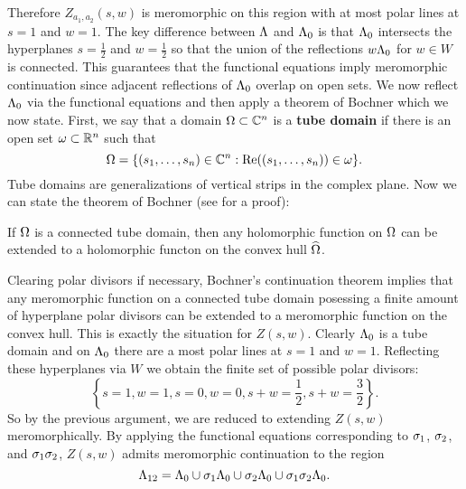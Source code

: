 \documentclass[12pt,reqno,oneside]{amsart}
\begin{document}
    Therefore $Z_{a_{1},a_{2}}(s,w)$ is meromorphic on this region with at most polar lines at $s = 1$ and $w = 1$. The key difference between $\Lambda$ and $\Lambda_{0}$ is that $\Lambda_{0}$ intersects the hyperplanes $s = \frac{1}{2}$ and $w = \frac{1}{2}$ so that the union of the reflections $w\Lambda_{0}$ for $w \in W$ is connected. This guarantees that the functional equations imply meromorphic continuation since adjacent reflections of $\Lambda_{0}$ overlap on open sets. We now reflect $\Lambda_{0}$ via the functional equations and then apply a theorem of Bochner which we now state. First, we say that a domain $\Omega \subset \mathbb{C}^{n}$ is a \textbf{tube domain} if there is an open set $\omega \subset \mathbb{R}^{n}$ such that
    \[
        \Omega = \{(s_{1},\ldots,s_{n}) \in \mathbb{C}^{n}:\mathrm{Re}((s_{1},\ldots,s_{n})) \in \omega\}.
    \]
    Tube domains are generalizations of vertical strips in the complex plane. Now we can state the theorem of Bochner (see \cite{hormander2000introduction} for a proof):

    \begin{theorem}
        If $\Omega$ is a connected tube domain, then any holomorphic function on $\Omega$ can be extended to a holomorphic functon on the convex hull $\widehat{\Omega}$.
    \end{theorem}

    Clearing polar divisors if necessary, Bochner's continuation theorem implies that any meromorphic function on a connected tube domain posessing a finite amount of hyperplane polar divisors can be extended to a meromorphic function on the convex hull. This is exactly the situation for $Z(s,w)$. Clearly $\Lambda_{0}$ is a tube domain and on $\Lambda_{0}$ there are a most polar lines at $s = 1$ and $w = 1$. Reflecting these hyperplanes via $W$ we obtain the finite set of possible polar divisors:
    \[
        \left\{s = 1, w = 1, s = 0, w = 0, s+w = \frac{1}{2}, s+w = \frac{3}{2}\right\}.
    \]
    So by the previous argument, we are reduced to extending $Z(s,w)$ meromorphically. By applying the functional equations corresponding to $\sigma_{1}$, $\sigma_{2}$, and $\sigma_{1}\sigma_{2}$, $Z(s,w)$ admits meromorphic continuation to the region
    \[
        \Lambda_{12} = \Lambda_{0} \cup \sigma_{1}\Lambda_{0} \cup \sigma_{2}\Lambda_{0} \cup \sigma_{1}\sigma_{2}\Lambda_{0}.
    \]
\end{document}
